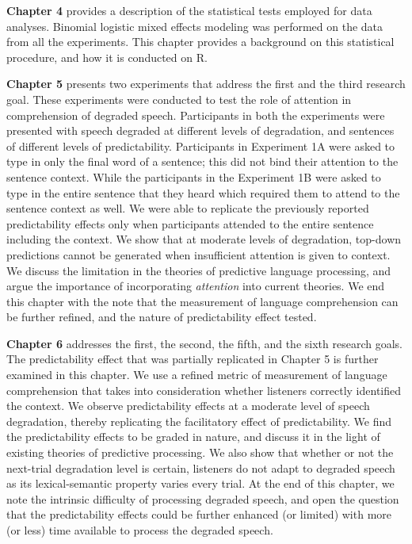 \documentclass[a4paper, nobind]{templates/ociamthesis}
\begin{document}
\textbf{Chapter 4} provides a description of the statistical tests employed for data analyses.
Binomial logistic mixed effects modeling was performed on the data from all the experiments.
This chapter provides a background on this statistical procedure,
and how it is conducted on R.

\textbf{Chapter 5} presents two experiments that address the first and the third research goal.
These experiments were conducted to test the role of attention in comprehension of degraded speech.
Participants in both the experiments were presented with speech degraded at different levels of degradation,
and sentences of different levels of predictability.
Participants in Experiment 1A were asked to type in only the final word of a sentence; this did not bind their attention to the sentence context.
While the participants in the Experiment 1B were asked to type in the entire sentence that they heard which required them to attend to the sentence context as well.
We were able to replicate the previously reported predictability effects only when participants attended to the entire sentence including the context.
We show that at moderate levels of degradation, top-down predictions cannot be generated when insufficient attention is given to context.
We discuss the limitation in the theories of predictive language processing, and argue the importance of incorporating \emph{attention} into current theories.
We end this chapter with the note that the measurement of language comprehension can be further refined,
and the nature of predictability effect tested.

\textbf{Chapter 6} addresses the first, the second, the fifth, and the sixth research goals.
The predictability effect that was partially replicated in Chapter 5 is further examined in this chapter.
We use a refined metric of measurement of language comprehension that takes into consideration whether listeners correctly identified the context.
We observe predictability effects at a moderate level of speech degradation, thereby replicating the facilitatory effect of predictability.
We find the predictability effects to be graded in nature,
and discuss it in the light of existing theories of predictive processing.
We also show that whether or not the next-trial degradation level is certain, listeners do not adapt to degraded speech as its lexical-semantic property varies every trial.
At the end of this chapter, we note the intrinsic difficulty of processing degraded speech, and open the question that the predictability effects could be further enhanced (or limited) with more (or less) time available to process the degraded speech.
\end{document}
